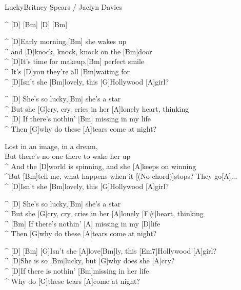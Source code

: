 \begin{song}{Lucky}{Britney Spears / Jaclyn Davies}

\begin{guitar}
^ [D] [Bm] [D] [Bm]\\

\end{guitar}
\begin{guitar}
^ [D]Early morning,[Bm] she wakes up\\
^ and [D]knock, knock, knock on the [Bm]door\\
^ [D]It's time for makeup,[Bm] perfect smile\\
^ It's [D]you they're all [Bm]waiting for \\
^ [D]Isn't she [Bm]lovely, this [G]Hollywood [A]girl?\\
\end{guitar}


\begin{guitar}
^ [D] She's so lucky,[Bm] she's a star\\
^ But she [G]cry, cry, cries in her [A]lonely heart, thinking\\
^ [D] If there's nothin' [Bm]  missing in my life\\
^ Then [G]why do these [A]tears come at night?\\
\end{guitar}

\begin{guitar}
Lost in an image, in a dream,\\
But there's no one there to wake her up\\
^ And the [D]world is spinning, and she [A]keeps on winning\\
^But [Bm]tell me, what happens when it [(No chord)]stops?   They go[A]...\\
^ [D]Isn't she [Bm]lovely, this [G]Hollywood [A]girl?\\
\end{guitar}

\begin{guitar}
^ [D] She's so lucky,[Bm] she's a star\\
^ But she [G]cry, cry, cries in her [A]lonely [F#]heart, thinking\\
^ [Bm] If there's nothin'  [A] missing in my [D]life\\
^ Then [G]why do these [A]tears come at night?\\
\end{guitar}


\begin{guitar}
^ [D]  [Bm]   [G]Isn't she [A]love[Bm]ly, this [Em7]Hollywood [A]girl?\\
^ [D]She is so [Bm]lucky, but [G]why does she [A]cry? \\
^ [D]If there is nothin' [Bm]missing in her life\\
^ Why do [G]these tears [A]come at night? \\
\end{guitar}

\end{song}
